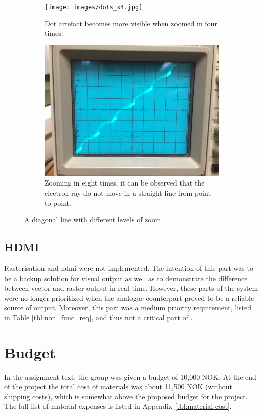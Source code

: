 \begin{figure}[h!]
	\ContinuedFloat
    \begin{subfigure}[b]{\textwidth}
		\centering
        \texttt{[image: images/dots\_x4.jpg]}
        \caption{Dot artefact becomes more visible when zoomed in four times.}
        \label{fig:dotx4}
    \end{subfigure}

    \begin{subfigure}[b]{\textwidth}
		\centering
        \includegraphics[height=0.4\textheight]{images/dots_x8.jpg}
        \caption{Zooming in eight times, it can be observed that the electron ray do not move in a straight line from point to point.}
        \label{fig:dotx8}
    \end{subfigure}
    \caption{A diagonal line with different levels of zoom.}
    \label{fig:artefact-dots}
\end{figure}

\subsection{HDMI}
Rasterisation and \gls{hdmi} were not implemented.
The intention of this part was to be a backup solution for visual output as well as to demonstrate the difference between vector and raster output in real-time.
However, these parts of the system were no longer prioritized when the analogue counterpart proved to be a reliable source of output.
Moreover, this part was a medium priority requirement, listed in Table \ref{tbl:non_func_req}, and thus not a critical part of \vthreek.

\section{Budget}
In the assignment text, the group was given a budget of 10,000 NOK.
At the end of the project the total cost of materials was about 11,500 NOK (without shipping costs), which is somewhat above the proposed budget for the project.
The full list of material expenses is listed in Appendix \ref{tbl:material-cost}.
